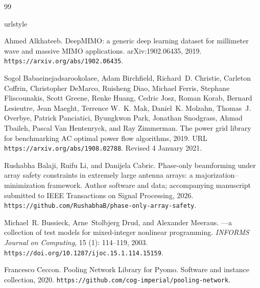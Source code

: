 \documentclass[pdflatex,sn-mathphys-num]{sn-jnl}
\theoremstyle{thmstyleone}
\theoremstyle{thmstylethree}
\newcounter{algorithm}
\begin{document}
\FloatBarrier
\begingroup\small\setlength{\bibsep}{2pt}\begin{thebibliography}{99}

\providecommand{\natexlab}[1]{#1}
\providecommand{\url}[1]{\texttt{#1}}
\expandafter\ifx\csname urlstyle\endcsname\relax
  \providecommand{\doi}[1]{doi: #1}\else
  \providecommand{\doi}{doi: \begingroup \urlstyle{rm}\Url}\fi


Ahmed Alkhateeb.
\newblock DeepMIMO: a generic deep learning dataset for millimeter wave and massive MIMO applications.
\newblock arXiv:1902.06435, 2019.
\newblock \url{https://arxiv.org/abs/1902.06435}.

Sogol Babaeinejadsarookolaee, Adam Birchfield, Richard~D. Christie, Carleton
  Coffrin, Christopher DeMarco, Ruisheng Diao, Michael Ferris, Stephane
  Fliscounakis, Scott Greene, Renke Huang, Cedric Josz, Roman Korab, Bernard
  Lesieutre, Jean Maeght, Terrence W.~K. Mak, Daniel~K. Molzahn, Thomas~J.
  Overbye, Patrick Panciatici, Byungkwon Park, Jonathan Snodgrass, Ahmad
  Tbaileh, Pascal {Van Hentenryck}, and Ray Zimmerman.
\newblock The power grid library for benchmarking {AC} optimal power flow
  algorithms, 2019.
\newblock URL \url{https://arxiv.org/abs/1908.02788}.
\newblock Revised 4 January 2021.

Rushabha Balaji, Ruifu Li, and Danijela Cabric.
\newblock Phase-only beamforming under array safety constraints in extremely large antenna arrays: a majorization--minimization framework.
\newblock Author software and data; accompanying manuscript submitted to IEEE Transactions on Signal Processing, 2026.
\newblock \url{https://github.com/RushabhaB/phase-only-array-safety}.

Michael~R. Bussieck, Arne~Stolbjerg Drud, and Alexander Meeraus.
---a collection of test models for mixed-integer nonlinear
  programming.
\newblock \emph{INFORMS Journal on Computing}, 15 (1):
  114--119, 2003.
\newblock \url{https://doi.org/10.1287/ijoc.15.1.114.15159}.

Francesco Ceccon.
\newblock Pooling Network Library for Pyomo.
\newblock Software and instance collection, 2020.
\newblock \url{https://github.com/cog-imperial/pooling-network}.


\end{thebibliography}
\end{document}
